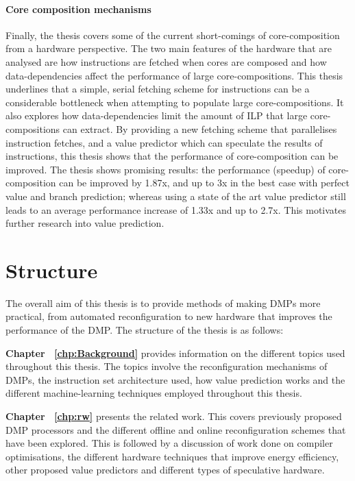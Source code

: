 \paragraph*{Core composition mechanisms} 
Finally, the thesis covers some of the current short-comings of core-composition from a hardware perspective.
The two main features of the hardware that are analysed are how instructions are fetched when cores are composed and how data-dependencies affect the performance of large core-compositions.
This thesis underlines that a simple, serial fetching scheme for instructions can be a considerable bottleneck when attempting to populate large core-compositions.
It also explores how data-dependencies limit the amount of ILP that large core-compositions can extract.
By providing a new fetching scheme that parallelises instruction fetches, and a value predictor which can speculate the results of instructions, this thesis shows that the performance of core-composition can be improved.
The thesis shows promising results: the performance (speedup) of core-composition can be improved by 1.87x, and up to 3x in the best case with perfect value and branch prediction; whereas using a state of the art value predictor still leads to an average performance increase of 1.33x and up to 2.7x.
This motivates further research into value prediction.

\section{Structure}
The overall aim of this thesis is to provide methods of making DMPs more practical, from automated reconfiguration to new hardware that improves the performance of the DMP.
The structure of the thesis is as follows:

\textbf{Chapter ~\ref{chp:Background}} provides information on the different topics used throughout this thesis. The topics involve the reconfiguration mechanisms of DMPs, the instruction set architecture used, how value prediction works and the different machine-learning techniques employed throughout this thesis.

\textbf{Chapter ~\ref{chp:rw}} presents the related work. This covers previously proposed DMP processors and the different offline and online reconfiguration schemes that have been explored. 
This is followed by a discussion of work done on compiler optimisations, the different hardware techniques that improve energy efficiency, other proposed value predictors and different types of speculative hardware.


